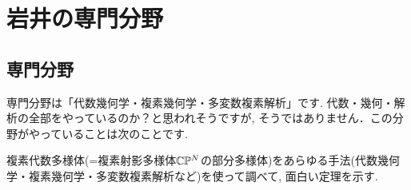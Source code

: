 
\section{岩井の専門分野}
\label{sec-1}

\subsection{専門分野}\vspace{-6pt}
\label{subsec-senmon}
専門分野は「代数幾何学・複素幾何学・多変数複素解析」です. 代数・幾何・解析の全部をやっているのか？と思われそうですが, そうではありません．この分野がやっていることは次のことです. 

\begin{tcolorbox}[mybox]
複素代数多様体(=複素射影多様体$\mathbb{C}\mathbb{P}^N$の部分多様体)をあらゆる手法(代数幾何学・複素幾何学・多変数複素解析など)を使って調べて, 面白い定理を示す.
 \end{tcolorbox}
 
